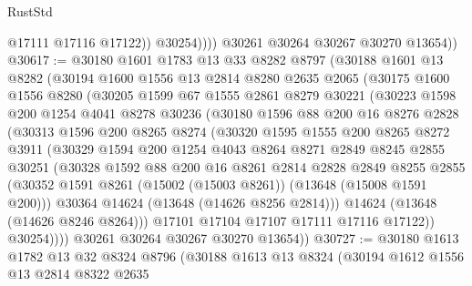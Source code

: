 \begin{lexlean}{RustStd}
\begin{coremodule}
                    @17111
                    @17116
                    @17122))
                @30254))))
        @30261
        @30264
        @30267
        @30270
        @13654))
@30617 := @30180
    @1601
    @1783
    @13
    @33
    @8282
    @8797
    (@30188
      @1601
      @13
      @8282
      (@30194
        @1600
        @1556
        @13
        @2814
        @8280
        @2635
        @2065
        (@30175
          @1600
          @1556
          @8280
          (@30205
            @1599
            @67
            @1555
            @2861
            @8279
            @30221
            (@30223
              @1598
              @200
              @1254
              @4041
              @8278
              @30236
              (@30180
                @1596
                @88
                @200
                @16
                @8276
                @2828
                (@30313
                  @1596
                  @200
                  @8265
                  @8274
                  (@30320
                    @1595
                    @1555
                    @200
                    @8265
                    @8272
                    @3911
                    (@30329
                      @1594
                      @200
                      @1254
                      @4043
                      @8264
                      @8271
                      @2849
                      @8245
                      @2855
                      @30251
                      (@30328
                        @1592
                        @88
                        @200
                        @16
                        @8261
                        @2814
                        @2828
                        @2849
                        @8255
                        @2855
                        (@30352 @1591 @8261 (@15002 (@15003 @8261)) (@13648 (@15008 @1591 @200)))
                        @30364
                        @14624
                        (@13648 (@14626 @8256 @2814)))
                      @14624
                      (@13648 (@14626 @8246 @8264)))
                    @17101
                    @17104
                    @17107
                    @17111
                    @17116
                    @17122))
                @30254))))
        @30261
        @30264
        @30267
        @30270
        @13654))
@30727 := @30180
    @1613
    @1782
    @13
    @32
    @8324
    @8796
    (@30188
      @1613
      @13
      @8324
      (@30194
        @1612
        @1556
        @13
        @2814
        @8322
        @2635

\end{coremodule}
\end{lexlean}
